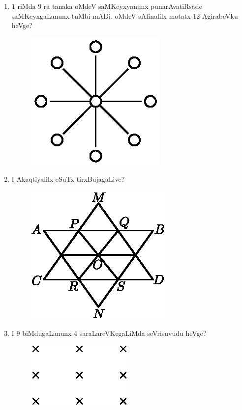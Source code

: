 \begin{enumerate}
\item $1$ riMda $9$ ra tanaka oMdeV saMKeyxyanunx punarAvatiRsade saMKeyxgaLanunx tuMbi mADi. oMdeV sAlinalilx motatx $12$ AgirabeVku heVge?
\begin{figure}[H]
\centering
\includegraphics{src/figures/exr28.eps}
\end{figure}

\eject

\item I Akaqtiyalilx eSuTx tirxBujagaLive?
\begin{figure}[H]
\centering
\includegraphics{src/figures/exr29.eps}
\end{figure}

\item I $9$ biMdugaLanunx $4$ saraLareVKegaLiMda seVrisuvudu heVge?
\begin{figure}[H]
\centering
\includegraphics{src/figures/exr30.eps}
\end{figure}


\end{enumerate}
